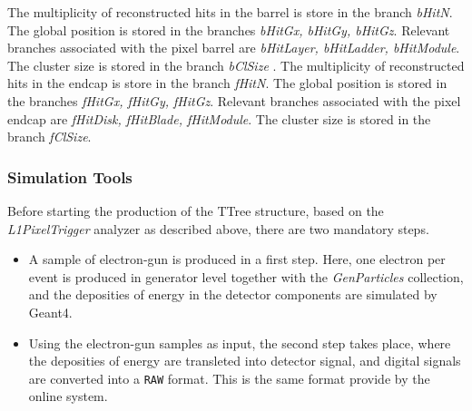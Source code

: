 \documentclass[a4paper,12pt,oneside]{article}
\begin{document}
\begin{itemize}
                    The multiplicity of reconstructed hits in the barrel is store in the
                     branch {\it bHitN}. The global position is stored in the branches {\it bHitGx, bHitGy, bHitGz}. Relevant
                     branches associated with the pixel barrel are {\it bHitLayer, bHitLadder, bHitModule}. 
                     The cluster size is stored in the branch {\it bClSize} . \newline
                     \noindent The multiplicity of reconstructed hits in the endcap is store in the branch {\it fHitN}. The global position is stored in the
                     branches {\it fHitGx, fHitGy, fHitGz}. Relevant branches associated with the pixel endcap are
                     {\it fHitDisk, fHitBlade, fHitModule}. The cluster size is stored in the branch {\it fClSize}. 
                   \end{itemize}


                   \subsubsection{Simulation Tools}

                   
                   Before starting the production of the TTree structure, based on the \textit{L1PixelTrigger} analyzer as described
                   above, there are two mandatory steps.
                   \begin{itemize}
                     \item A sample of electron-gun is produced in a first step. Here, one electron per event is produced in generator
                       level together with the {\it GenParticles} collection, and the deposities of energy in the detector components
                       are simulated by Geant4.
                     \item Using the electron-gun samples as input, the second step takes place, where the deposities of energy are
                       transleted into detector signal, and digital signals are converted into a {\texttt{RAW}} format. This is the
                       same format provide by the online system.
                   \end{itemize}
\end{document}
